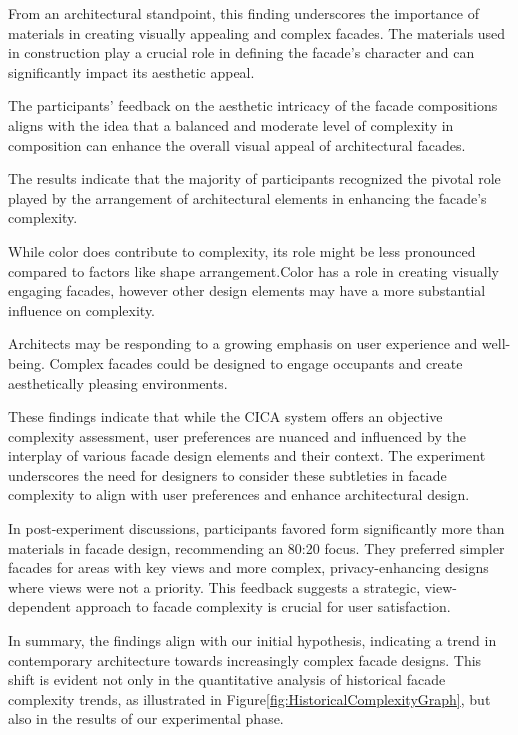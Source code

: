 
From an architectural standpoint, this finding underscores the importance of materials in creating visually appealing and complex facades.
 The materials used in construction play a crucial role in defining the facade's character and can significantly impact its aesthetic appeal.

The participants' feedback on the aesthetic intricacy of the facade compositions aligns with the idea that a balanced and moderate level of complexity in composition can enhance the overall visual appeal of architectural facades.

The results indicate that the majority of participants recognized the pivotal role played by the arrangement of architectural elements in enhancing the facade's complexity.

While color does contribute to complexity, its role might be less pronounced compared to factors like shape arrangement.Color has a role in creating visually engaging facades, however other design elements may have a more substantial influence on complexity.

 Architects may be responding to a growing emphasis on user experience and well-being.
 Complex facades could be designed to engage occupants and create aesthetically pleasing environments.

These findings indicate that while the CICA system offers an objective complexity assessment, user preferences are nuanced and influenced by the interplay of various facade design elements and their context.
 The experiment underscores the need for designers to consider these subtleties in facade complexity to align with user preferences and enhance architectural design.

In post-experiment discussions, participants favored form significantly more than materials in facade design, recommending an 80:20 focus. They preferred simpler facades for areas with key views and more complex, privacy-enhancing designs where views were not a priority. This feedback suggests a strategic, view-dependent approach to facade complexity is crucial for user satisfaction.


In summary, the findings align with our initial hypothesis, indicating a trend in contemporary architecture towards increasingly complex facade designs.
This shift is evident not only in the quantitative analysis of historical facade complexity trends, as illustrated in Figure\ref{fig:HistoricalComplexityGraph}, but also in the results of our experimental phase.

